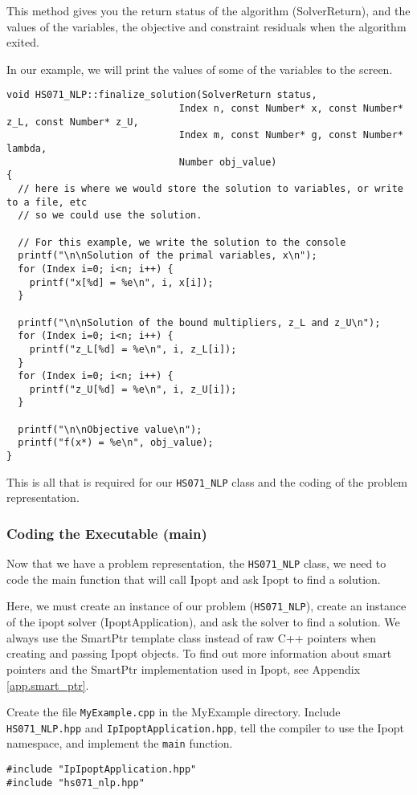 \documentclass[letter,10pt]{article}
\begin{document}
{This method gives you the return status of the algorithm
(SolverReturn), and the values of the variables, 
the objective and constraint residuals when the algorithm exited.

In our example, we will print the values of some of the variables to 
the screen.

\begin{verbatim}
void HS071_NLP::finalize_solution(SolverReturn status,
                              Index n, const Number* x, const Number* z_L, const Number* z_U,
                              Index m, const Number* g, const Number* lambda,
                              Number obj_value)
{
  // here is where we would store the solution to variables, or write to a file, etc
  // so we could use the solution. 

  // For this example, we write the solution to the console
  printf("\n\nSolution of the primal variables, x\n");
  for (Index i=0; i<n; i++) {
    printf("x[%d] = %e\n", i, x[i]); 
  }

  printf("\n\nSolution of the bound multipliers, z_L and z_U\n");
  for (Index i=0; i<n; i++) {
    printf("z_L[%d] = %e\n", i, z_L[i]); 
  }
  for (Index i=0; i<n; i++) {
    printf("z_U[%d] = %e\n", i, z_U[i]); 
  }

  printf("\n\nObjective value\n");
  printf("f(x*) = %e\n", obj_value); 
}
\end{verbatim}

This is all that is required for our {\tt HS071\_NLP} class and 
the coding of the problem representation.
 
\subsubsection{Coding the Executable (main)}
Now that we have a problem representation, the {\tt HS071\_NLP} class,
we need to code the main function that will call Ipopt and ask Ipopt
to find a solution.

Here, we must create an instance of our problem ({\tt HS071\_NLP}), create an
instance of the ipopt solver (IpoptApplication), and ask the solver to
find a solution. We always use the SmartPtr template class instead of
raw C++ pointers when creating and passing Ipopt objects. To find out
more information about smart pointers and the SmartPtr implementation
used in Ipopt, see Appendix \ref{app.smart_ptr}.

Create the file {\tt MyExample.cpp} in the MyExample directory.
Include {\tt HS071\_NLP.hpp} and {\tt IpIpoptApplication.hpp}, tell
the compiler to use the Ipopt namespace, and implement the {\tt main}
function.
\begin{verbatim}
#include "IpIpoptApplication.hpp"
#include "hs071_nlp.hpp"


\end{verbatim}}
\end{document}
